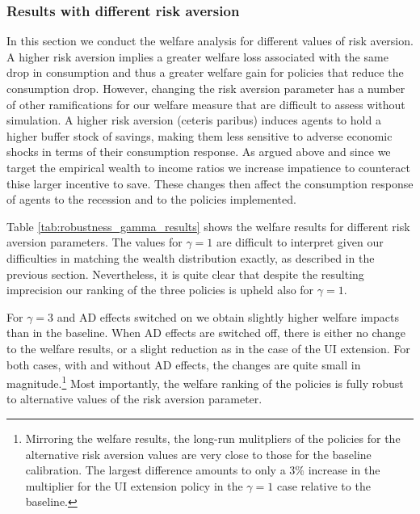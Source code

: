 \documentclass[../HAFiscal]{subfiles}
\begin{document}
\subsubsection{Results with different risk aversion}
\label{sec:robust_gamma_results}

In this section we conduct the welfare analysis for different values of risk aversion. A higher risk aversion implies a greater welfare loss associated with the same drop in consumption and thus a greater welfare gain for policies that reduce the consumption drop. However, changing the risk aversion parameter has a number of other ramifications for our welfare measure that are difficult to assess without simulation. A higher risk aversion (ceteris paribus) induces agents to hold a higher buffer stock of savings, making them less sensitive to adverse economic shocks in terms of their consumption response. As argued above and since we target the empirical wealth to income ratios we increase impatience to counteract thise larger incentive to save. These changes then affect the consumption response of agents to the recession and to the policies implemented. 

Table \ref{tab:robustness_gamma_results} shows the welfare results for different risk aversion parameters. The values for $\gamma = 1$ are difficult to interpret given our difficulties in matching the wealth distribution exactly, as described in the previous section. Nevertheless, it is quite clear that despite the resulting imprecision our ranking of the three policies is upheld also for $\gamma=1$.

For $\gamma=3$ and AD effects switched on we obtain slightly higher welfare impacts than in the baseline. When AD effects are switched off, there is either no change to the welfare results, or a slight reduction as in the case of the UI extension. For both cases, with and without AD effects, the changes are quite small in magnitude.\footnote{Mirroring the welfare results, the long-run mulitpliers of the policies  for the alternative risk aversion values are very close to those for the baseline calibration. The largest difference amounts to only a 3\% increase in the multiplier for the UI extension policy in the $\gamma = 1$ case relative to the baseline.} Most importantly, the welfare ranking of the policies is fully robust to alternative values of the risk aversion parameter.
\end{document}
